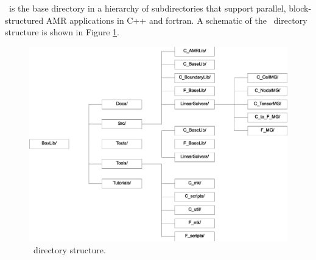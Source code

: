 \BoxLib\ is the base directory in a hierarchy of subdirectories that
support parallel, block-structured AMR applications in C++ and fortran.
A schematic of the \BoxLib\ directory structure is shown in Figure 
\ref{fig:boxlib_directory}.
\begin{figure}[h]
\centering
\includegraphics[width=6.5in]{./Overview/boxlib_directory_bw2}
\caption{\label{fig:boxlib_directory}\BoxLib\ directory structure.}
\end{figure}

